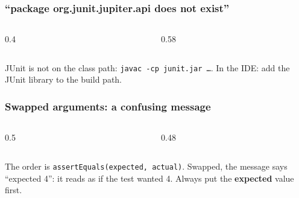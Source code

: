 \documentclass[aspectratio=169,10pt,compress]{beamer}
\begin{document}
\begin{frame}[t,fragile] \frametitle{``package org.junit.jupiter.api does not exist''}
  \begin{columns}[T]
    \begin{column}{0.4\textwidth}
    \end{column}
    \begin{column}{0.58\textwidth}
    \end{column}
  \end{columns}

  \vspace{0.2em}
  \small JUnit is not on the class path: \texttt{javac -cp junit.jar \dots}. In the IDE: add the JUnit library to the build path.
\end{frame}




\begin{frame}[t,fragile] \frametitle{Swapped arguments: a confusing message}
  \begin{columns}[T]
    \begin{column}{0.5\textwidth}
    \end{column}
    \begin{column}{0.48\textwidth}
    \end{column}
  \end{columns}

  \vspace{0.2em}
  \small The order is \texttt{assertEquals(expected, actual)}. Swapped, the message says ``expected 4'': it reads as if
  the test wanted 4. Always put the \textbf{expected} value first.
\end{frame}
\end{document}
